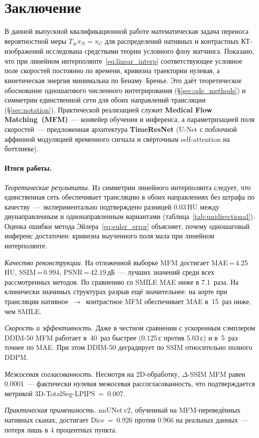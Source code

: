 \section{Заключение}
\label{sec:conclusion}

В данной выпускной квалификационной работе математическая задача переноса вероятностной меры $T_{\#}\pi_N = \pi_C$ для распределений нативных и контрастных КТ-изображений исследована средствами теории условного флоу матчинга. Показано, что при линейном интерполянте~\eqref{eq:linear_interp} соответствующее условное поле скоростей постоянно по времени, кривизна траектории нулевая, а кинетическая энергия минимальна по Бенаму--Бренье. Это даёт теоретическое обоснование одношагового численного интегрирования (\S\ref{sec:ode_methods}) и симметрии единственной сети для обоих направлений трансляции (\S\ref{sec:notation}). Практической реализацией служит \textbf{Medical Flow Matching~(MFM)}~--- конвейер обучения и инференса, а параметризацией поля скоростей~--- предложенная архитектура \textbf{TimeResNet} (U-Net с поблочной аффинной модуляцией временного сигнала и свёрточным self-attention на боттлнеке).

\paragraph{Итоги работы.}

\textit{Теоретические результаты.} Из симметрии линейного интерполянта следует, что единственная сеть обеспечивает трансляцию в обоих направлениях без штрафа по качеству~--- экспериментально подтверждено разницей 0.03\,HU между двунаправленным и однонаправленным вариантами (таблица~\ref{tab:unidirectional}). Оценка ошибки метода Эйлера~\eqref{eq:euler_error} объясняет, почему одношаговый инференс достаточен: кривизна выученного поля мала при линейном интерполянте.

\textit{Качество реконструкции.} На отложенной выборке MFM достигает MAE\,=\,4.25\,HU, SSIM\,=\,0.994, PSNR\,=\,42.19\,дБ~--- лучших значений среди всех рассмотренных методов. По сравнению со SMILE MAE ниже в 7.1~раза. На клинически значимых структурах разрыв ещё значительнее: на аорте при трансляции нативное~$\to$~контрастное MFM обеспечивает MAE в~15~раз ниже, чем SMILE.

\textit{Скорость и эффективность.} Даже в честном сравнении с ускоренным сэмплером DDIM-50 MFM работает в~40~раз быстрее (0.125\,с против 5.03\,с) и в~5~раз точнее по MAE. При этом DDIM-50 деградирует по SSIM относительно полного DDPM.

\textit{Межосевая согласованность.} Несмотря на 2D-обработку, $\Delta$-SSIM MFM равен 0.0001~--- фактически нулевая межосевая рассогласованность, что подтверждается метрикой 3D-TotalSeg-LPIPS~=~0.007.

\textit{Практическая применимость.} nnUNet\,v2, обученный на MFM-переведённых нативных сканах, достигает Dice~=~0.926 против 0.966 на реальных данных~--- потеря лишь в 4 процентных пункта.
